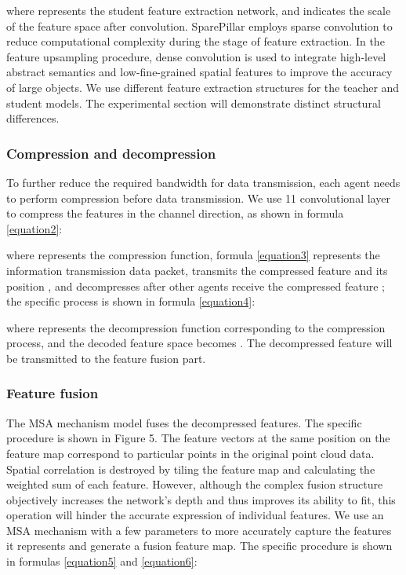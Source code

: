 \documentclass[lettersize,journal]{IEEEtran}
\begin{document}
where  represents the student feature extraction network, and  indicates the scale of the feature space after convolution. SparePillar employs sparse convolution to reduce computational complexity during the stage of feature extraction. In the feature upsampling procedure, dense convolution is used to integrate high-level abstract semantics and low-fine-grained spatial features to improve the accuracy of large objects. We use different feature extraction structures for the teacher and student models. The experimental section will demonstrate distinct structural differences.



\subsubsection{Compression and decompression}

To further reduce the required bandwidth for data transmission, each agent needs to perform compression before data transmission. We use 11 convolutional layer to compress the features in the channel direction, as shown in formula \eqref{equation2}:




where  represents the compression function, formula \eqref{equation3} represents the information transmission data packet,  transmits the compressed feature   and its position  , and decompresses after other agents receive the compressed feature ; the specific process is shown in formula \eqref{equation4}:




where  represents the decompression function corresponding to the compression process, and the decoded feature space becomes  . The decompressed feature  will be transmitted to the feature fusion part.


\subsubsection{Feature fusion}

The MSA mechanism model \cite{32} fuses the decompressed features. The specific procedure is shown in Figure 5. The feature vectors at the same position on the feature map correspond to particular points in the original point cloud data. Spatial correlation is destroyed by tiling the feature map and calculating the weighted sum of each feature. However, although the complex fusion structure objectively increases the network's depth and thus improves its ability to fit, this operation will hinder the accurate expression of individual features. We use an MSA mechanism with a few parameters to more accurately capture the features it represents and generate a fusion feature map. The specific procedure is shown in formulas \eqref{equation5} and \eqref{equation6}:
\end{document}
